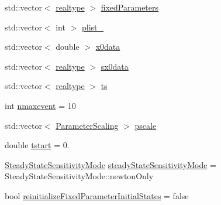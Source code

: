 \begin{DoxyCompactItemize}
\item 
std\+::vector$<$ \mbox{\hyperlink{namespaceamici_a1bdce28051d6a53868f7ccbf5f2c14a3}{realtype}} $>$ \mbox{\hyperlink{classamici_1_1_model_ac1d5115134ec1c839f1e913724ceb2b4}{fixed\+Parameters}}
\item 
std\+::vector$<$ int $>$ \mbox{\hyperlink{classamici_1_1_model_a67919df701b4afd60d13fc890432d9ec}{plist\+\_\+}}
\item 
std\+::vector$<$ double $>$ \mbox{\hyperlink{classamici_1_1_model_ac305126c59aab952182f851679df24f9}{x0data}}
\item 
std\+::vector$<$ \mbox{\hyperlink{namespaceamici_a1bdce28051d6a53868f7ccbf5f2c14a3}{realtype}} $>$ \mbox{\hyperlink{classamici_1_1_model_a7ebdaf00a4177be525b45a39edf1865c}{sx0data}}
\item 
std\+::vector$<$ \mbox{\hyperlink{namespaceamici_a1bdce28051d6a53868f7ccbf5f2c14a3}{realtype}} $>$ \mbox{\hyperlink{classamici_1_1_model_aa7014a80e7b102f85a10e3b9a480e8e5}{ts}}
\item 
int \mbox{\hyperlink{classamici_1_1_model_aff0f3f25d886279a90dbf0571956885c}{nmaxevent}} = 10
\item 
std\+::vector$<$ \mbox{\hyperlink{namespaceamici_a42f062082226e9284c201d9eab71a3a0}{Parameter\+Scaling}} $>$ \mbox{\hyperlink{classamici_1_1_model_a5d1c7237dc998202fe1b3393b50f77ce}{pscale}}
\item 
double \mbox{\hyperlink{classamici_1_1_model_a514d7e4eb49966fc7d165e0f87fe7f3c}{tstart}} = 0.
\item 
\mbox{\hyperlink{namespaceamici_a1f7d44f04185d57423d01d47d13470a6}{Steady\+State\+Sensitivity\+Mode}} \mbox{\hyperlink{classamici_1_1_model_a27c46c338afef0ba6da6d0695aa5e844}{steady\+State\+Sensitivity\+Mode}} = Steady\+State\+Sensitivity\+Mode\+::newton\+Only
\item 
bool \mbox{\hyperlink{classamici_1_1_model_a48ac1f2997787adc548bd6bfcec857d5}{reinitialize\+Fixed\+Parameter\+Initial\+States}} = false
\end{DoxyCompactItemize}
